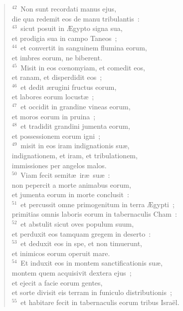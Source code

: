 \begin{flushleft}
\begin{verse}
${}^{42}$~Non sunt recordati manus ejus,\\ die qua redemit eos de manu tribulantis~:\\
${}^{43}$~sicut posuit in \AE gypto signa sua,\\ et prodigia sua in campo Taneos~;\\
${}^{44}$~et convertit in sanguinem flumina eorum,\\ et imbres eorum, ne biberent.\\
${}^{45}$~Misit in eos cœnomyiam, et comedit eos,\\ et ranam, et disperdidit eos~;\\
${}^{46}$~et dedit \ae rugini fructus eorum,\\ et labores eorum locust\ae~;\\
${}^{47}$~et occidit in grandine vineas eorum,\\ et moros eorum in pruina~;\\
${}^{48}$~et tradidit grandini jumenta eorum,\\ et possessionem eorum igni~;\\
${}^{49}$~misit in eos iram indignationis su\ae ,\\ indignationem, et iram, et tribulationem,\\ immissiones per angelos malos.\\
${}^{50}$~Viam fecit semit\ae\ ir\ae\ su\ae~:\\ non pepercit a morte animabus eorum,\\ et jumenta eorum in morte conclusit~:\\
${}^{51}$~et percussit omne primogenitum in terra \AE gypti~;\\ primitias omnis laboris eorum in tabernaculis Cham~:\\
${}^{52}$~et abstulit sicut oves populum suum,\\ et perduxit eos tamquam gregem in deserto~:\\
${}^{53}$~et deduxit eos in spe, et non timuerunt,\\ et inimicos eorum operuit mare.\\
${}^{54}$~Et induxit eos in montem sanctificationis su\ae ,\\ montem quem acquisivit dextera ejus~;\\ et ejecit a facie eorum gentes,\\ et sorte divisit eis terram in funiculo distributionis~;\\
${}^{55}$~et habitare fecit in tabernaculis eorum tribus Isra\"el.\\

\end{verse}
\end{flushleft}
